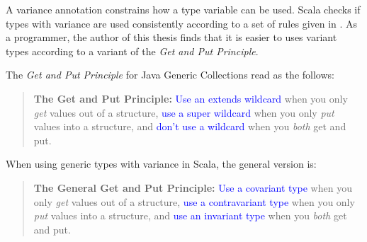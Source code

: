 A variance annotation constrains how a type variable can be used.  
Scala checks if types with variance are 
used consistently according to a set of rules given in \citep[Section 
4.5]{scala_specification}.  As a programmer, the author of this thesis 
finds that it is easier to uses variant types according to a variant of the 
{\it Get and Put Principle}.


The {\it Get and Put Principle} for Java Generic Collections \citep[Section 
2.4]{JGC} read as the follows:
\begin{quotation}
{\bf The Get and Put Principle:} \textcolor{blue}{Use an extends wildcard}
when you only {\it get} values out of a structure, \textcolor{blue}{use a super 
wildcard} when you only {\it put} values into a structure, and \textcolor{blue}{don't 
use a wildcard } when you  {\it both}  get and put.
\end{quotation}

When using generic types with variance in Scala, the general version is: 

\begin{quotation}
{\bf The General Get and Put Principle:} \textcolor{blue}{Use a covariant type}
when you only {\it get} values out of a structure, \textcolor{blue}{use a contravariant type}
when you only  {\it put}  values into a structure, 
and \textcolor{blue}{use an invariant type} when you  {\it both}  get and put.
\end{quotation}

\begin{comment}
  \begin{figure}[t]
  \begin{lstlisting}[language=scala, escapechar=?]
trait Stack[+E] {
  def empty():Boolean
//  def push(elt:E):Unit  // covariant type E occurs in contravariant position in type E of value  elt
  def pop():E
}

trait Stack[-E] {
  def empty():Boolean
  def push(elt:E):Unit  
//  def pop():E // contravariant type E occurs in covariant position in type ()E of method pop
}
  \end{lstlisting}


  \caption{Scala Example: Stack with variance}
  \label{scala_variance}
\end{figure}
\end{comment}

